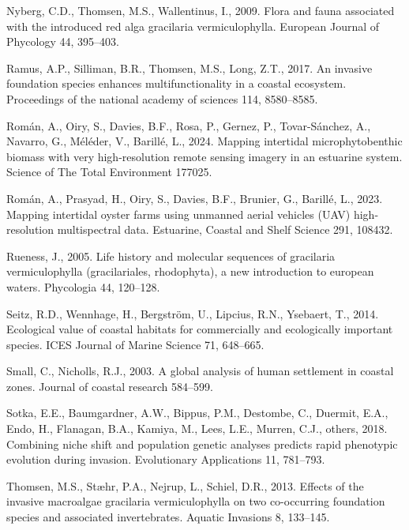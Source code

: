 \documentclass[
  letterpaper,
  DIV=11,
  numbers=noendperiod]{scrartcl}
\newlength{\cslhangindent}
\newenvironment{CSLReferences}[2] %
 {\begin{list}{}{%
  \setlength{\itemindent}{0pt}
  \setlength{\leftmargin}{0pt}
  \setlength{\parsep}{0pt}
  \ifodd #1
   \setlength{\leftmargin}{\cslhangindent}
   \setlength{\itemindent}{-1\cslhangindent}
  \fi
  \setlength{\itemsep}{#2\baselineskip}}}
 {\end{list}}
\begin{document}
\begin{CSLReferences}{1}{0}
Nyberg, C.D., Thomsen, M.S., Wallentinus, I., 2009. Flora and fauna
associated with the introduced red alga gracilaria vermiculophylla.
European Journal of Phycology 44, 395--403.

Ramus, A.P., Silliman, B.R., Thomsen, M.S., Long, Z.T., 2017. An
invasive foundation species enhances multifunctionality in a coastal
ecosystem. Proceedings of the national academy of sciences 114,
8580--8585.

Román, A., Oiry, S., Davies, B.F., Rosa, P., Gernez, P., Tovar-Sánchez,
A., Navarro, G., Méléder, V., Barillé, L., 2024. Mapping intertidal
microphytobenthic biomass with very high-resolution remote sensing
imagery in an estuarine system. Science of The Total Environment 177025.

Román, A., Prasyad, H., Oiry, S., Davies, B.F., Brunier, G., Barillé,
L., 2023. Mapping intertidal oyster farms using unmanned aerial vehicles
(UAV) high-resolution multispectral data. Estuarine, Coastal and Shelf
Science 291, 108432.

Rueness, J., 2005. Life history and molecular sequences of gracilaria
vermiculophylla (gracilariales, rhodophyta), a new introduction to
european waters. Phycologia 44, 120--128.

Seitz, R.D., Wennhage, H., Bergström, U., Lipcius, R.N., Ysebaert, T.,
2014. Ecological value of coastal habitats for commercially and
ecologically important species. ICES Journal of Marine Science 71,
648--665.

Small, C., Nicholls, R.J., 2003. A global analysis of human settlement
in coastal zones. Journal of coastal research 584--599.

Sotka, E.E., Baumgardner, A.W., Bippus, P.M., Destombe, C., Duermit,
E.A., Endo, H., Flanagan, B.A., Kamiya, M., Lees, L.E., Murren, C.J.,
others, 2018. Combining niche shift and population genetic analyses
predicts rapid phenotypic evolution during invasion. Evolutionary
Applications 11, 781--793.

Thomsen, M.S., Stæhr, P.A., Nejrup, L., Schiel, D.R., 2013. Effects of
the invasive macroalgae gracilaria vermiculophylla on two co-occurring
foundation species and associated invertebrates. Aquatic Invasions 8,
133--145.


\end{CSLReferences}
\end{document}
